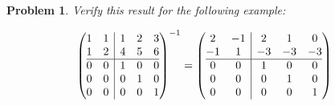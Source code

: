 \documentclass{article}
\newtheorem{problem}{Problem}
\begin{document}
\begin{problem}
Verify this result for the following example:

\begin{align*}
& \left(
\begin{array}{@{}cc|ccc@{}}
1 & 1 & 1 & 2 & 3 \\
1 & 2 & 4 & 5 & 6 \\ \hline
0 & 0 & 1 & 0 & 0 \\
0 & 0 & 0 & 1 & 0 \\
0 & 0 & 0 & 0 & 1
\end{array}
\right)^{-1} =
\left(
\begin{array}{@{}cc|ccc@{}}
2 & -1 & 2 & 1 & 0 \\
-1 & 1 & -3 & -3 & -3 \\ \hline
0 & 0 & 1 & 0 & 0 \\
0 & 0 & 0 & 1 & 0 \\
0 & 0 & 0 & 0 & 1
\end{array}
\right) 
\end{align*}
\end{problem}
\end{document}

